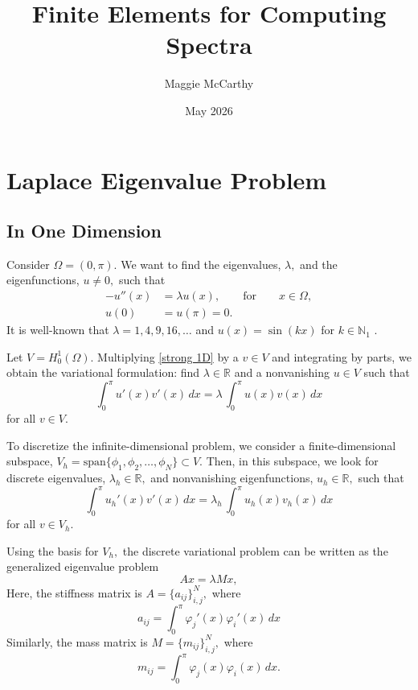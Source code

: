 \documentclass[12pt,a4paper]{article}
\title{Finite Elements for Computing Spectra}
\author{Maggie McCarthy}
\date{May 2026}
\theoremstyle{boldthm}
\theoremstyle{bolddefn}
\begin{document}
\maketitle

\section{Laplace Eigenvalue Problem}

\subsection{In One Dimension}


Consider $\Omega = (0, \pi).$ We want to find the eigenvalues, $\lambda,$ and the eigenfunctions, $u \ne 0,$ such that
\begin{equation}\label{strong 1D}
\begin{aligned}
     -u''(x) &= \lambda u(x), \qquad \text{for} \qquad x \in \Omega,\\
     u(0) &=u(\pi) = 0.
\end{aligned}
\end{equation}
It is well-known that $\lambda = 1, 4, 9, 16, \dots$ and $u(x) = \sin(kx)$ for $k \in \mathbb{N}_1$ \cite{boffi}.


Let $V = H_0^1(\Omega).$ Multiplying \eqref{strong 1D} by a $v \in V$ and integrating by parts, we obtain the variational formulation: find $\lambda \in \mathbb{R}$ and a nonvanishing $u \in V$ such that
\begin{equation}
    \int_{0}^{\pi} u'(x) v'(x) \, dx = \lambda \, \int_0^{\pi} u(x) v(x) \, dx
\end{equation}
for all $v \in V.$

To discretize the infinite-dimensional problem, we consider a finite-dimensional subspace, $V_h = \text{span}\{\phi_1, \phi_2, \dots, \phi_N\} \subset V.$ Then, in this subspace, we look for discrete eigenvalues, $\lambda_h \in \mathbb{R},$ and nonvanishing eigenfunctions, $u_h \in \mathbb{R},$ such that
\begin{equation}
    \int_{0}^{\pi} u_h'(x) v'(x) \, dx = \lambda_h \, \int_0^{\pi} u_h(x) v_h(x) \, dx
\end{equation}
for all $v \in V_h.$

Using the basis for $V_h,$ the discrete variational problem can be written as the generalized eigenvalue problem
$$ Ax = \lambda M x, $$
Here, the stiffness matrix is $A = \{a_{ij}\}_{i,j}^N,$ where
\begin{equation}
a_{ij}
=
\int_0^\pi \varphi_j'(x)\varphi_i'(x)\,dx
\end{equation}
Similarly, the mass matrix is $M = \{m_{ij}\}_{i,j}^N,$ where
\begin{equation}
m_{ij}
=
\int_0^\pi \varphi_j(x)\varphi_i(x)\,dx.
\end{equation}
\end{document}

